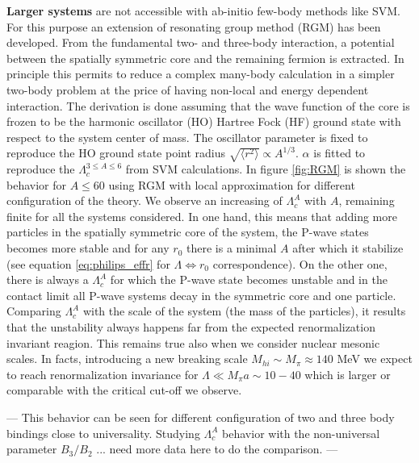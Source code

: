 \documentclass[preprint,12pt]{elsarticle}
\begin{document}
\textbf{Larger systems} are not accessible with ab-initio few-body methods like SVM. 
For this purpose an extension of resonating group method (RGM) \cite{PhysRev.52.1083,Naidon_2016} has been developed.
From the fundamental two- and three-body interaction, a potential between the spatially symmetric core and the remaining fermion is extracted. 
In principle this permits to reduce a complex many-body calculation in a simpler two-body problem at the price of having non-local and energy dependent interaction.
The derivation is done assuming that the wave function of the core is frozen to be the harmonic oscillator (HO) Hartree Fock (HF) ground state with respect to the system center of mass.
The oscillator parameter is fixed to reproduce the HO ground state point radius $\sqrt{\langle r^2 \rangle} \propto A^{1/3}$.
$\alpha$ is fitted to reproduce the $\Lambda_c^{3\le A \le 6}$ from SVM calculations.
In figure \ref{fig:RGM} is shown the behavior for $A \le 60$ using RGM with local approximation for different configuration of the theory. 
We observe an increasing of $\Lambda_c^A$ with $A$, remaining finite for all the systems considered.
In one hand, this means that adding more particles in the spatially symmetric core of the system, the P-wave states becomes more stable and for any $r_0$ there is a minimal $A$ after which it stabilize (see equation \ref{eq:philips_effr} for $\Lambda\Leftrightarrow r_0$ correspondence).
On the other one, there is always a $\Lambda_c^A$ for which the P-wave state becomes unstable and in the contact limit all P-wave systems decay in the symmetric core and one particle.
Comparing  $\Lambda_c^A$  with the scale of the system (the mass of the particles), it results that the unstability always happens far from the expected renormalization invariant reagion.
This remains true also when we consider nuclear mesonic scales.
In facts, introducing a new breaking scale $M_{hi}\sim M_{\pi}\approx 140$ MeV we expect to reach renormalization invariance for $\Lambda\ll M_{\pi} a \sim 10-40$ which is larger or comparable with the critical cut-off we observe.

--- This behavior can be seen for different configuration of two and three body bindings close to universality.
Studying $\Lambda_c^A$ behavior with the non-universal parameter $B_3/B_2$ ... need more data here to do the comparison. ---
\end{document}
